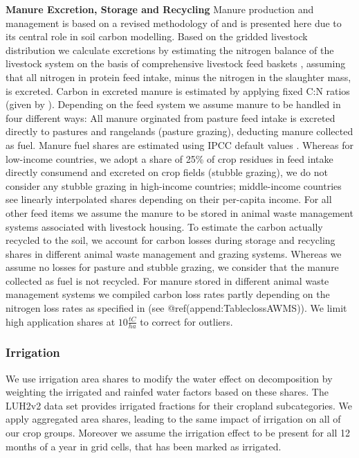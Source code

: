 \documentclass[gc, manuscript]{copernicus}
\begin{document}
\textbf{Manure Excretion, Storage and Recycling} Manure production and
management is based on a revised methodology of
\citep{bodirsky_n2o_2012} and is presented here due to its central role
in soil carbon modelling. Based on the gridded livestock distribution we
calculate excretions by estimating the nitrogen balance of the livestock
system on the basis of comprehensive livestock feed baskets
\citep{weindl}, assuming that all nitrogen in protein feed intake, minus
the nitrogen in the slaughter mass, is excreted. Carbon in excreted
manure is estimated by applying fixed C:N ratios (given by
\citep{ipcc_2019_2019}). Depending on the feed system we assume manure
to be handled in four different ways: All manure orginated from pasture
feed intake is excreted directly to pastures and rangelands (pasture
grazing), deducting manure collected as fuel. Manure fuel shares are
estimated using IPCC default values \citep{ippc_2006_2006}. Whereas for
low-income countries, we adopt a share of 25\% of crop residues in feed
intake directly consumend and excreted on crop fields (stubble grazing),
we do not consider any stubble grazing in high-income countries;
middle-income countries see linearly interpolated shares depending on
their per-capita income. For all other feed items we assume the manure
to be stored in animal waste management systems associated with
livestock housing. To estimate the carbon actually recycled to the soil,
we account for carbon losses during storage and recycling shares in
different animal waste management and grazing systems. Whereas we assume
no losses for pasture and stubble grazing, we consider that the manure
collected as fuel is not recycled. For manure stored in different animal
waste management systems we compiled carbon loss rates partly depending
on the nitrogen loss rates as specified in \citep{bodirsky_n2o_2012}
(see @ref(append:TableclossAWMS)). We limit high application shares at
\(10\tfrac{\unit{tC}}{\unit{ha}}\) to correct for outliers.

\hypertarget{sec:irrigation}{%
\subsubsection{Irrigation}\label{sec:irrigation}}

We use irrigation area shares to modify the water effect on
decomposition by weighting the irrigated and rainfed water factors based
on these shares. The LUH2v2 data set provides irrigated fractions for
their cropland subcategories. We apply aggregated area shares, leading
to the same impact of irrigation on all of our crop groups. Moreover we
assume the irrigation effect to be present for all 12 months of a year
in grid cells, that has been marked as irrigated.
\end{document}
